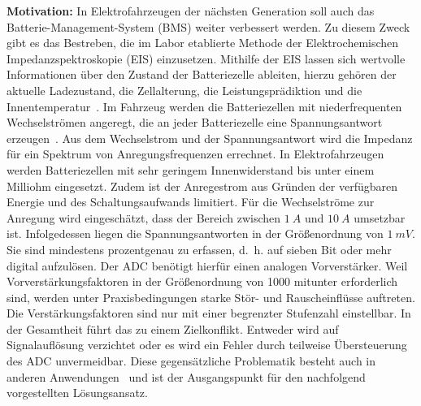 		\begin{multicols}{2}
			\captionsetup{format=plain} 
			\parindent0mm
			
			\begin{mdboxshad}
				{\textbf{Motivation: }In Elektrofahrzeugen der nächsten Generation soll auch das Batterie-Management-System (BMS) weiter verbessert werden. Zu diesem Zweck gibt es das Bestreben, die im Labor etablierte Methode der Elektrochemischen Impedanzspektroskopie (EIS) einzusetzen. Mithilfe der EIS lassen sich wertvolle Informationen über den Zustand der Batteriezelle ableiten, hierzu gehören der aktuelle Ladezustand, die Zellalterung, die Leistungsprädiktion und die Innentemperatur~\cite{Schmidt-2013, Kohs-2022}. Im Fahrzeug werden die Batteriezellen mit niederfrequenten Wechselströmen angeregt, die an jeder Batteriezelle eine Spannungsantwort erzeugen~\cite{KeilJossen-2012, Roscher-2016, Hammerschmidt-2016, Roscher-2015}. Aus dem Wechselstrom und der Spannungsantwort wird die Impedanz für ein Spektrum von Anregungsfrequenzen errechnet. In Elektrofahrzeugen werden Batteriezellen mit sehr geringem Innenwiderstand bis unter einem Milliohm eingesetzt. Zudem ist der Anregestrom aus Gründen der verfügbaren Energie und des Schaltungsaufwands limitiert. Für die Wechselströme zur Anregung wird eingeschätzt, dass der Bereich zwischen $\SI{1}{A}$ und $\SI{10}{A}$ umsetzbar ist. Infolgedessen liegen die Spannungsantworten in der Größenordnung von $\SI{1}{mV}$. Sie sind mindestens prozentgenau zu erfassen, d.~h. auf sieben Bit oder mehr digital aufzulösen. Der ADC benötigt hierfür einen analogen Vorverstärker. Weil Vorverstärkungsfaktoren in der Größenordnung von 1000 mitunter erforderlich sind, werden unter Praxisbedingungen starke Stör- und Rauscheinflüsse auftreten. Die Verstärkungsfaktoren sind nur mit einer begrenzter Stufenzahl einstellbar. In der Gesamtheit führt das zu einem Zielkonflikt. Entweder wird auf Signalauflösung verzichtet oder es wird ein Fehler durch teilweise Übersteuerung des ADC unvermeidbar. Diese gegensätzliche Problematik besteht auch in anderen Anwendungen~\cite{Abel-1991,Ting-2013, Zhou-2019, Chan-2012} und ist der Ausgangspunkt für den nachfolgend vorgestellten Lösungsansatz.}
			
			\end{mdboxshad} 
\vspace{10mm}


\end{multicols}
